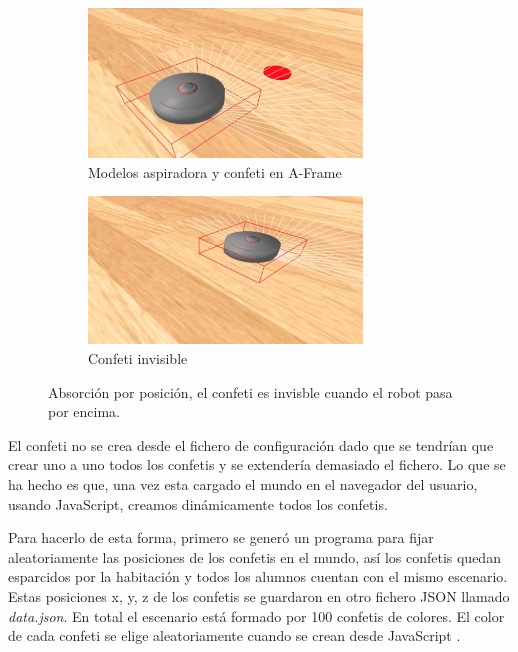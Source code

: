 \begin{figure}[H]
  \begin{subfigure}[b]{0.5\textwidth}
  \centering
    \includegraphics[width=0.8\textwidth, height=0.5\textwidth]{chapters/images/prototiporoomba.png}
    \caption{Modelos aspiradora y confeti en A-Frame}
    \label{fig:f1}
  \end{subfigure}
  \hfill
  \begin{subfigure}[b]{0.5\textwidth}
  \centering
    \includegraphics[width=0.8\textwidth, height=0.5\textwidth]{chapters/images/prototiporoomba2.png}
	\caption{Confeti invisible}    
    \label{fig:f2}
 
  \end{subfigure}
  \caption{Absorción por posición, el confeti es invisble cuando el robot pasa por encima.}
\end{figure}

El confeti no se crea desde el fichero de configuración dado que se tendrían que crear uno a uno  todos los confetis y se extendería demasiado el fichero. Lo que se ha hecho es que, una vez esta cargado el mundo en el navegador del usuario, usando JavaScript, creamos dinámicamente todos los confetis.

Para hacerlo de esta forma, primero se generó un programa para fijar aleatoriamente las posiciones de los confetis en el mundo, así los confetis quedan esparcidos por la habitación y todos los alumnos cuentan con el mismo escenario. Estas posiciones x, y, z de los confetis se guardaron en otro fichero JSON llamado \textit{data.json}. En total el escenario está formado por 100 confetis de colores. El color de cada confeti se elige aleatoriamente cuando se crean desde JavaScript .

